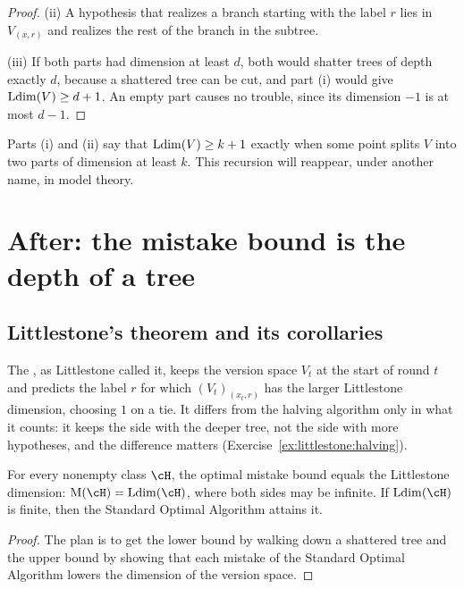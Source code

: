 \begin{refsection}
\begin{proof}
(ii) A hypothesis that realizes a branch starting with the label $r$ lies in $V_{(x,r)}$ and realizes the rest of the branch in the subtree.

(iii) If both parts had dimension at least $d$, both would shatter trees of depth exactly $d$, because a shattered tree can be cut, and part (i) would give $\operatorname{Ldim}(V)\ge d+1$. An empty part causes no trouble, since its dimension $-1$ is at most $d-1$.
\end{proof}

Parts (i) and (ii) say that $\operatorname{Ldim}(V)\ge k+1$ exactly when some point splits $V$ into two parts of dimension at least $k$. This recursion will reappear, under another name, in model theory.

\section{After: the mistake bound is the depth of a tree}\label{sec:littlestone:after-online}

\subsection{Littlestone's theorem and its corollaries}\label{sec:littlestone:theorem}

The , as Littlestone called it, keeps the version space $V_t$ at the start of round $t$ and predicts the label $r$ for which $(V_t)_{(x_t,r)}$ has the larger Littlestone dimension, choosing $1$ on a tie. It differs from the halving algorithm only in what it counts: it keeps the side with the deeper tree, not the side with more hypotheses, and the difference matters (Exercise~\ref{ex:littlestone:halving}).

\begin{theorem}\label{thm:littlestone:main}
For every nonempty class $\cH$, the optimal mistake bound equals the Littlestone dimension: $\littlestoneM(\cH)=\littlestoneLdim(\cH)$, where both sides may be infinite. If $\littlestoneLdim(\cH)$ is finite, then the Standard Optimal Algorithm attains it.
\end{theorem}

\begin{proof}
The plan is to get the lower bound by walking down a shattered tree and the upper bound by showing that each mistake of the Standard Optimal Algorithm lowers the dimension of the version space.


\end{proof}
\end{refsection}

